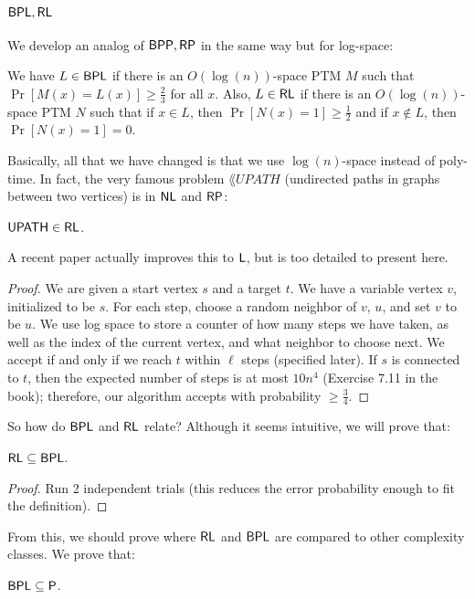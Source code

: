 \newcommand{\UPATH}{\lang{UPATH}}
\subsection{${\mathsf{BPL}}, {\mathsf{RL}}$}
We develop an analog of ${\mathsf{BPP}}, {\mathsf{RP}}$ in the same way but for log-space:
\begin{definition}
We have $L \in {\ensuremath{\mathsf{BPL}}}$ if there is an $O(\log(n))$-space PTM $M$ such that $\Pr[M(x) = L(x)] \ge \frac{2}{3}$ for all $x$. Also, $L \in {\ensuremath{\mathsf{RL}}}$ if there is an $O(\log(n))$-space PTM $N$ such that if $x \in L$, then $\Pr[N(x) = 1] \ge \frac{1}{2}$ and if $x \notin L$, then $\Pr[N(x) = 1] = 0$. 
\end{definition}
Basically, all that we have changed is that we use $\log(n)$-space instead of poly-time. In fact, the very famous problem $\UPATH$ (undirected paths in graphs between two vertices) is in ${\mathsf{NL}}$ and ${\mathsf{RP}}$:
\begin{theorem}
$\UPATH \in \RL$.
\end{theorem}
A recent paper actually improves this to ${\mathsf{L}}$, but is too detailed to present here.
\begin{proof}
We are given a start vertex $s$ and a target $t$. We have a variable vertex $v$, initialized to be $s$. For each step, choose a random neighbor of $v$, $u$, and set $v$ to be $u$. We use log space to store a counter of how many steps we have taken, as well as the index of the current vertex, and what neighbor to choose next. We accept if and only if we reach $t$ within $\ell$ steps (specified later). If $s$ is connected to $t$, then the expected number of steps is at most $10n^4$ (Exercise 7.11 in the book); therefore, our algorithm accepts with probability $\ge \frac{3}{4}$. 
\end{proof}
So how do ${\mathsf{BPL}}$ and ${\mathsf{RL}}$ relate? Although it seems intuitive, we will prove that:
\begin{theorem}
${\mathsf{RL}} \subseteq {\ensuremath{\mathsf{BPL}}}$.
\end{theorem}
\begin{proof}
Run 2 independent trials (this reduces the error probability enough to fit the definition). 
\end{proof}
From this, we should prove where ${\mathsf{RL}}$ and ${\mathsf{BPL}}$ are compared to other complexity classes. We prove that:
\begin{theorem}
${\mathsf{BPL}} \subseteq {\ensuremath{\mathsf{P}}}$.
\end{theorem}
